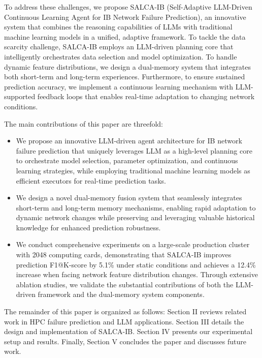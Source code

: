 \documentclass[conference]{IEEEtran}
\begin{document}
To address these challenges, we propose SALCA-IB (Self-Adaptive LLM-Driven Continuous Learning Agent for IB Network Failure Prediction), an innovative system that combines the reasoning capabilities of LLMs with traditional machine learning models in a unified, adaptive framework. To tackle the data scarcity challenge, SALCA-IB employs an LLM-driven planning core that intelligently orchestrates data selection and model optimization. To handle dynamic feature distributions, we design a dual-memory system that integrates both short-term and long-term experiences. Furthermore, to ensure sustained prediction accuracy, we implement a continuous learning mechanism with LLM-supported feedback loops that enables real-time adaptation to changing network conditions.

The main contributions of this paper are threefold:
\begin{itemize}
    \item We propose an innovative LLM-driven agent architecture for IB network failure prediction that uniquely leverages LLM as a high-level planning core to orchestrate model selection, parameter optimization, and continuous learning strategies, while employing traditional machine learning models as efficient executors for real-time prediction tasks.
    \item We design a novel dual-memory fusion system that seamlessly integrates short-term and long-term memory mechanisms, enabling rapid adaptation to dynamic network changes while preserving and leveraging valuable historical knowledge for enhanced prediction robustness.
    \item We conduct comprehensive experiments on a large-scale production cluster with 2048 computing cards, demonstrating that SALCA-IB improves prediction F1@K-score by 5.1\% under static conditions and achieves a 12.4\% increase when facing network feature distribution changes. Through extensive ablation studies, we validate the substantial contributions of both the LLM-driven framework and the dual-memory system components.
\end{itemize}

The remainder of this paper is organized as follows: Section II reviews related work in HPC failure prediction and LLM applications. Section III details the design and implementation of SALCA-IB. Section IV presents our experimental setup and results. Finally, Section V concludes the paper and discusses future work.
\end{document}
